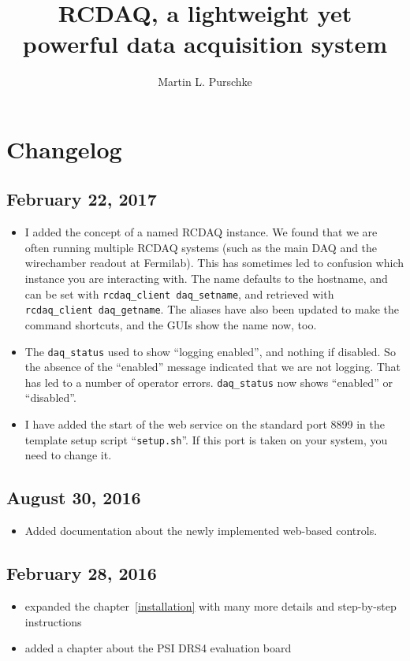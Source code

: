 \documentclass{article}[11pt]
\begin{document}
\title{RCDAQ, a lightweight yet powerful data acquisition system}
\author{Martin L. Purschke}
\maketitle

\tableofcontents

\newpage

\section{Changelog}

\subsection{February 22, 2017}
\begin{itemize}
\item I added the concept of a named RCDAQ instance. We found that we
  are often running multiple RCDAQ systems (such as the main DAQ and
  the wirechamber readout at Fermilab). This has sometimes led to
  confusion which instance you are interacting with. The name
  defaults to the hostname, and can be set with
  \verb|rcdaq_client daq_setname|, and retrieved with
  \verb|rcdaq_client daq_getname|.  The aliases have also been
  updated to make the command shortcuts, and the GUIs show the name
  now, too. 
\item The \verb|daq_status| used to show ``logging enabled'', and nothing if
  disabled. So the absence of the ``enabled'' message indicated
  that we are not logging. That has led to a number of operator
  errors. \verb|daq_status| now shows ``enabled'' or ``disabled''. 
\item I have added the start of the web service on the standard port
  8899 in the template setup script ``\verb|setup.sh|''. If this port
  is taken on your system, you need to change it. 

\end{itemize}

\subsection{August 30, 2016}
\begin{itemize}
\item Added documentation about the newly implemented web-based controls. 
\end{itemize}

\subsection{February 28, 2016}
\begin{itemize}
\item expanded the chapter~\ref{installation} with many more details
  and step-by-step instructions
\item  added a chapter about the PSI DRS4 evaluation board 
\end{itemize}
\end{document}

